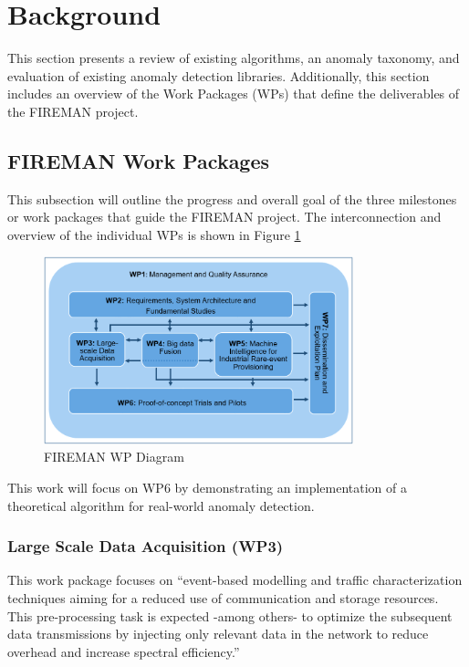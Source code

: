 \section{Background}
This section presents a review of existing algorithms, an anomaly taxonomy, and evaluation of existing anomaly detection libraries. Additionally, this section includes an overview of the Work Packages (WPs) that define the deliverables of the FIREMAN project.

\subsection{FIREMAN Work Packages}
\label{ref_FIREMAN_WP}

This subsection will outline the progress and overall goal of the three milestones or work packages that guide the FIREMAN project. The interconnection and overview of the individual WPs is shown in Figure \ref{fig:wp-diagram}

\begin{figure}[H]
    \includegraphics[width=0.8\textwidth]{Images/FIREMAN_pert_diagram.png}
    \caption{FIREMAN WP Diagram}
    \label{fig:wp-diagram}
\end{figure}

This work will focus on WP6 by demonstrating an implementation of a theoretical algorithm for real-world anomaly detection.

\subsubsection{Large Scale Data Acquisition (WP3)}

This work package focuses on \enquote{event-based modelling and traffic characterization techniques aiming for a reduced use of communication and storage resources. This pre-processing task is expected -among others- to optimize the subsequent data transmissions by injecting only relevant data in the network to reduce overhead and increase spectral efficiency.} 

